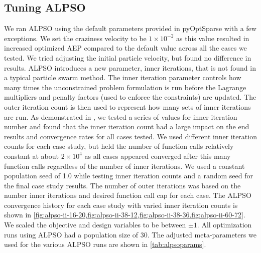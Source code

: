 \documentclass{jpconf}
\begin{document}
\subsection{Tuning ALPSO} 
We ran ALPSO using the default parameters provided in pyOptSparse \cite{wu2020} with a few exceptions.
We set the craziness velocity to be $1\times10^{-2}$ as this value resulted in increased optimized AEP compared to the default value across all the cases we tested. We tried adjusting the initial particle velocity, but found no difference in results. ALPSO introduces a new parameter, inner iterations, that is not found in a typical particle swarm method. The inner iteration parameter controls how many times the unconstrained problem formulation is run before the Lagrange multipliers and penalty factors (used to enforce the constraints) are updated. The outer iteration count is then used to represent how many sets of inner iterations are run. As demonstrated in \cite{jansen2011_alpso}, we tested a series of values for inner iteration number and found that the inner iteration count had a large impact on the end results and convergence rates for all cases tested. We used different inner iteration counts for each case study, but held the number of function calls relatively constant at about $2\times 10^4$ as all cases appeared converged after this many function calls regardless of the number of inner iterations. We used a constant population seed of 1.0 while testing inner iteration counts and a random seed for the final case study results. The number of outer iterations was based on the number inner iterations and desired function call cap for each case. The ALPSO convergence history for each case study with varied inner iteration counts is shown in \cref{fig:alpso-ii-16-20,fig:alpso-ii-38-12,fig:alpso-ii-38-36,fig:alpso-ii-60-72}. We scaled the objective and design variables to be between $\pm1$.  All optimization runs using ALPSO had a population size of 30. The adjusted meta-parameters we used for the various ALPSO runs are shown in \cref{tab:alpsoparams}.
\end{document}
